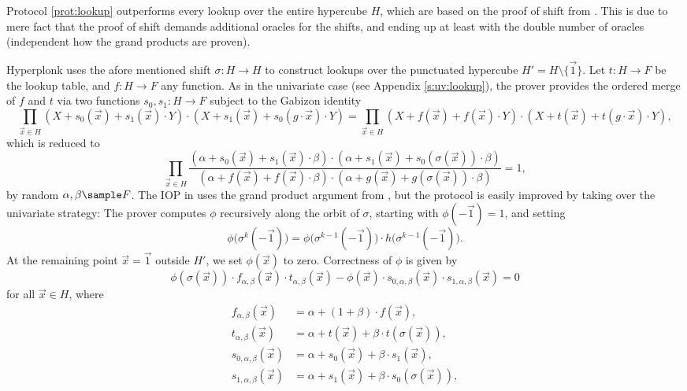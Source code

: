 \documentclass[11pt]{article}
\theoremstyle{definition}
\theoremstyle{remark}
\begin{document}
Protocol \ref{prot:lookup} outperforms every lookup over the entire hypercube $H$, which are based on the proof of shift from \cite{TensorR1CS}. 
This is due to mere fact that the proof of shift demands additional oracles for the shifts, and ending up at least with the double number of oracles (independent how the grand products are proven).   

Hyperplonk \cite{Hyperplonk} uses the afore mentioned shift $\sigma: H\rightarrow H$ to construct lookups over the punctuated hypercube $H' = H\setminus\{\vec 1\}$. 
Let $t: H\rightarrow F$ be the lookup table, and $f: H\rightarrow F$ any function.
As in the univariate case (see Appendix \ref{s:uv:lookup}), the prover provides the ordered merge of $f$ and $t$ via two functions $s_0, s_1: H\rightarrow F$ subject to the Gabizon identity
\[
\prod_{\vec x\in H} (X + s_0(\vec x) + s_1(\vec x)\cdot Y)\cdot (X + s_1(\vec x) + s_0(g\cdot \vec x)\cdot Y) = \prod_{\vec x\in H} (X + f(\vec x) + f(\vec x)\cdot Y)\cdot (X + t(\vec x) + t(g\cdot \vec x)\cdot Y),
\]
which is reduced to 
\[
\prod_{\vec x\in H} \frac{(\alpha + s_0(\vec x) + s_1(\vec x)\cdot \beta)\cdot (\alpha + s_1(\vec x) + s_0(\sigma(\vec x))\cdot \beta)}{
(\alpha + f(\vec x) + f(\vec x)\cdot \beta)\cdot (\alpha + g(\vec x) + g(\sigma(\vec x))\cdot \beta)} = 1,
\]
by random $\alpha, \beta\sample F$.
The IOP in \cite{Hyperplonk} uses the grand product argument from \cite{Quarks}, but the protocol is easily improved by taking over the univariate strategy:
The prover computes $\phi$ recursively along the orbit of $\sigma$, starting with $\phi(-\vec 1) = 1$, and setting
\[
\phi\big(\sigma^{k}(-\vec 1)\big) = \phi\big(\sigma^{k-1}(-\vec 1)\big) \cdot h\big(\sigma^{k-1}(-\vec 1)\big).
\]
At the remaining point $\vec x = \vec 1$ outside $H'$, we set $\phi(\vec x)$ to zero.
Correctness of $\phi$ is given by 
\begin{equation*}
\phi(\sigma( \vec x)) \cdot f_{\alpha,\beta}(\vec x)\cdot t_{\alpha,\beta}(\vec x) 
- \phi(\vec x)\cdot s_{0,\alpha,\beta}(\vec x)\cdot s_{1,\alpha,\beta}(\vec x)
= 0 
\end{equation*}
for all $\vec x \in H$, where 
\begin{align*}
f_{\alpha,\beta} (\vec x) &=\alpha +  (1+\beta)\cdot f(\vec x),
\\
t_{\alpha, \beta}(\vec x) &= \alpha + t(\vec x) + \beta\cdot t(\sigma( \vec x)),
\\
s_{0,\alpha,\beta}(\vec x) &= \alpha + s_0(\vec x) + \beta\cdot s_1(\vec x),
\\
s_{1,\alpha,\beta}(\vec x) &=  \alpha + s_1(\vec x) + \beta\cdot s_0(\sigma( \vec x)),
\end{align*}
\end{document}
